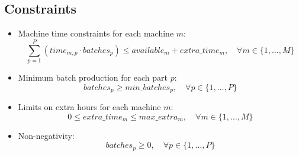 \documentclass{article}
\begin{document}
\subsection*{Constraints}
\begin{itemize}
    \item Machine time constraints for each machine $m$:
    \[
    \sum_{p=1}^{P} (time_{m,p} \cdot batches_{p}) \leq available_{m} + extra\_time_{m}, \quad \forall m \in \{1, \ldots, M\}
    \]
    \item Minimum batch production for each part $p$:
    \[
    batches_{p} \geq min\_batches_{p}, \quad \forall p \in \{1, \ldots, P\}
    \]
    \item Limits on extra hours for each machine $m$:
    \[
    0 \leq extra\_time_{m} \leq max\_extra_{m}, \quad \forall m \in \{1, \ldots, M\}
    \]
    \item Non-negativity:
    \[
    batches_{p} \geq 0, \quad \forall p \in \{1, \ldots, P\}
    \]
\end{itemize}
\end{document}
